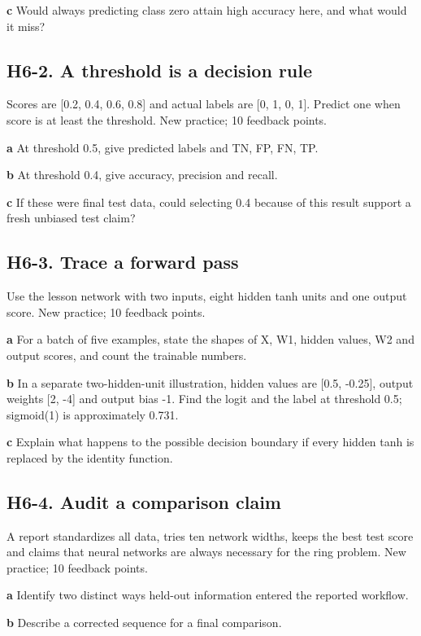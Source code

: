 \documentclass[11pt,letterpaper]{article}
\theoremstyle{definition}\newtheorem{definition}{Definition}\newtheorem{example}{Example}
\numberwithin{equation}{section}
\begin{document}
\textbf{c} Would always predicting class zero attain high accuracy here, and what would it miss?

\par\noindent\begin{minipage}{\linewidth}
\subsection*{H6-2. A threshold is a decision rule}
Scores are [0.2, 0.4, 0.6, 0.8] and actual labels are [0, 1, 0, 1]. Predict one when score is at least the threshold. New practice; 10 feedback points.

\textbf{a} At threshold 0.5, give predicted labels and TN, FP, FN, TP.

\end{minipage}\par\medskip
\textbf{b} At threshold 0.4, give accuracy, precision and recall.

\textbf{c} If these were final test data, could selecting 0.4 because of this result support a fresh unbiased test claim?

\par\noindent\begin{minipage}{\linewidth}
\subsection*{H6-3. Trace a forward pass}
Use the lesson network with two inputs, eight hidden tanh units and one output score. New practice; 10 feedback points.

\textbf{a} For a batch of five examples, state the shapes of X, W1, hidden values, W2 and output scores, and count the trainable numbers.

\end{minipage}\par\medskip
\textbf{b} In a separate two-hidden-unit illustration, hidden values are [0.5, -0.25], output weights [2, -4] and output bias -1. Find the logit and the label at threshold 0.5; sigmoid(1) is approximately 0.731.

\textbf{c} Explain what happens to the possible decision boundary if every hidden tanh is replaced by the identity function.

\par\noindent\begin{minipage}{\linewidth}
\subsection*{H6-4. Audit a comparison claim}
A report standardizes all data, tries ten network widths, keeps the best test score and claims that neural networks are always necessary for the ring problem. New practice; 10 feedback points.

\textbf{a} Identify two distinct ways held-out information entered the reported workflow.

\end{minipage}\par\medskip
\textbf{b} Describe a corrected sequence for a final comparison.
\end{document}
